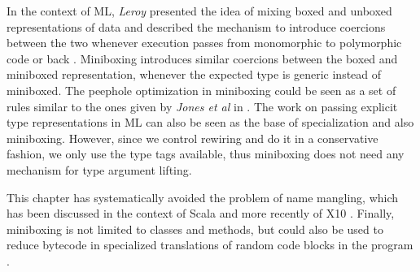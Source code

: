 In the context of ML, {\em Leroy} presented the idea of mixing boxed and unboxed representations of data and described the mechanism to introduce coercions between the two whenever execution passes from monomorphic to polymorphic code or back \cite{leroy-unboxed-objects}. Miniboxing introduces similar coercions between the boxed and miniboxed representation, whenever the expected type is generic instead of miniboxed. The peephole optimization in miniboxing could be seen as a set of rules similar to the ones given by {\em Jones et al} in \cite{spj-unboxed-values}. The work on passing explicit type representations in ML \cite{harper-intensional-type-analysis, tolmach-tag-free-gc, tarditi-til, minamide-full-lifting} can also be seen as the base of specialization and also miniboxing. However, since we control rewiring and do it in a conservative fashion, we only use the type tags available, thus miniboxing does not need any mechanism for type argument lifting.

This chapter has systematically avoided the problem of name mangling, which has been discussed in the context of Scala \cite{iuli-thesis} and more recently of X10 \cite{x10-fast-dispatch}. Finally, miniboxing is not limited to classes and methods, but could also be used to reduce bytecode in specialized translations of random code blocks in the program \cite{bridging}.
